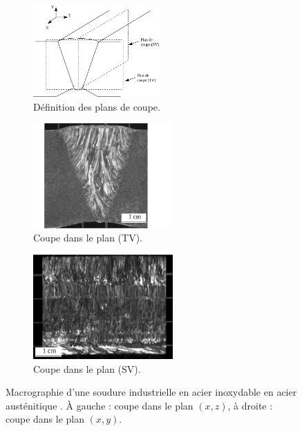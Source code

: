 \begin{figure}[!h]
	\hspace{-2cm}
    \centering
    \begin{subfigure}[c]{0.25\textwidth}
    	\centering
        \includegraphics[height=3.5cm]{./img/soudure3.png}
        \vspace{0.03cm}
        \caption{\centering  Définition des plans de coupe.}
    \end{subfigure}
    \hspace{1cm}
    \begin{subfigure}[c]{0.25\textwidth}
    	\centering
        \includegraphics[height=4cm]{./img/soudure1.png}
        \caption{\centering  Coupe dans le plan (TV).}
    \end{subfigure}
        \hspace{1.5cm}
    \begin{subfigure}[c]{0.25\textwidth}
    	\centering
		\includegraphics[height=4cm]{./img/soudure2.png}
        \caption{\centering Coupe dans le plan (SV).}
    \end{subfigure}
    \caption{Macrographie d'une soudure industrielle en acier inoxydable en acier austénitique \citep{chassignole}. À gauche : coupe dans le plan $(x,z)$, à droite : coupe dans le plan $(x,y)$.\label{soudure}}
\end{figure}

